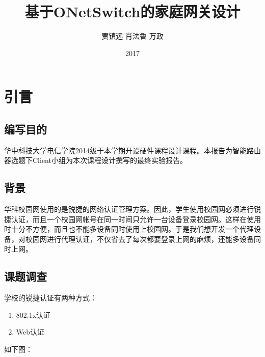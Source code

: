 \documentclass{itecreport-zh}
\title{基于ONetSwitch的家庭网关设计}{A Gateway Design Basing on ONetSwitch}
\author
{贾镇远  肖法鲁  万政}
{Zhenyuan Jia,Falu Xiao,Zheng Wan}
\date{2017}{7}{5}
\begin{document}
\frontmatter
\maketitle
\makeabstract
\tableofcontents
\mainmatter

\chapter{引言}\label{chapter:1}
\section{编写目的}\label{sec:1}
华中科技大学电信学院2014级于本学期开设硬件课程设计课程。本报告为智能路由器选题下Client小组为本次课程设计撰写的最终实验报告。
\section{背景}
华科校园网使用的是锐捷的网络认证管理方案。因此，学生使用校园网必须进行锐捷认证，而且一个校园网帐号在同一时间只允许一台设备登录校园网。这样在使用时十分不方便，而且也不能多设备同时使用上校园网。于是我们想开发一个代理设备，对校园网进行代理认证，不仅省去了每次都要登录上网的麻烦，还能多设备同时上网。
\section{课题调查}
学校的锐捷认证有两种方式：
\begin{enumerate}
    \item 802.1x认证
    \item Web认证
\end{enumerate}

如下图：
\end{document}
